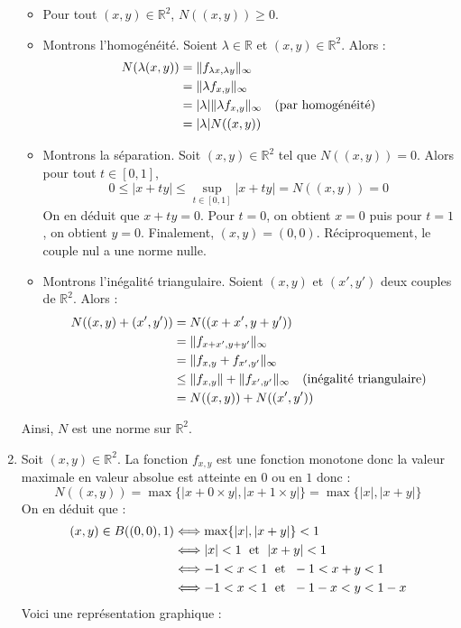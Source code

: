 \documentclass[a4paper,10pt]{report}
\begin{document}
\begin{enumerate}
\begin{itemize}
\item Pour tout $(x,y) \in \mathbb{R}^2$, $N((x,y)) \geq 0$.
\item Montrons l'homogénéité. Soient $\lambda \in \mathbb{R}$ et $(x,y) \in \mathbb{R}^2$. Alors :
\begin{align*}
N(\lambda (x,y)) & = \Vert f_{\lambda x, \lambda y} \Vert_{\infty} \\
& = \Vert \lambda f_{x,y} \Vert_{\infty} \\
& = \vert \lambda \vert \Vert \lambda f_{x,y} \Vert_{\infty} \quad \hbox{(par homogénéité)} \\
& = \vert \lambda \vert N((x,y)) 
\end{align*}
\item Montrons la séparation. Soit $(x,y) \in \mathbb{R}^2$ tel que $N((x,y))=0$. Alors pour tout $t \in [0,1]$,
$$ 0 \leq \vert x+ty \vert \leq \sup_{t \in [0,1]} \vert x+ty \vert = N((x,y))=0 $$
On en déduit que $x+ty=0$. Pour $t=0$, on obtient $x=0$ puis pour $t=1$, on obtient $y=0$. Finalement, $(x,y)=(0,0)$. Réciproquement, le couple nul a une norme nulle.
\item Montrons l'inégalité triangulaire. Soient $(x,y)$ et $(x',y')$ deux couples de $\mathbb{R}^2$. Alors :
\begin{align*}
N((x,y)+(x',y')) & = N((x+x',y+y')) \\
& = \Vert f_{x+x',y+y'} \Vert_{\infty} \\
& = \Vert f_{x,y} + f_{x',y'} \Vert_{\infty} \\
& \leq \Vert f_{x,y} \Vert + \Vert f_{x',y'} \Vert_{\infty} \quad \hbox{(inégalité triangulaire)} \\
& = N((x,y))+ N((x',y')) 
\end{align*}
\end{itemize}
Ainsi, $N$ est une norme sur $\mathbb{R}^2$.
\item Soit $(x,y) \in \mathbb{R}^2$. La fonction $f_{x,y}$ est une fonction monotone donc la valeur maximale en valeur absolue est atteinte en $0$ ou en $1$ donc :
$$ N((x,y)) = \max \lbrace \vert x+ 0 \times y \vert, \vert x+ 1 \times y \vert \rbrace = \max \lbrace \vert x \vert, \vert x+y \vert \rbrace$$
On en déduit que :
\begin{align*}
(x,y) \in B((0,0),1) & \Longleftrightarrow \max \lbrace \vert x \vert, \vert x+y \vert \rbrace <1 \\
& \Longleftrightarrow \vert x \vert < 1 \; \hbox{ et } \; \vert x+y \vert < 1 \\
& \Longleftrightarrow -1 <x<1 \; \hbox{ et } \;  -1 < x+y<1 \\
& \Longleftrightarrow - 1<x<1 \; \hbox{ et } \; -1-x <y <1-x
\end{align*}
Voici une représentation graphique :


\end{enumerate}
\end{document}
